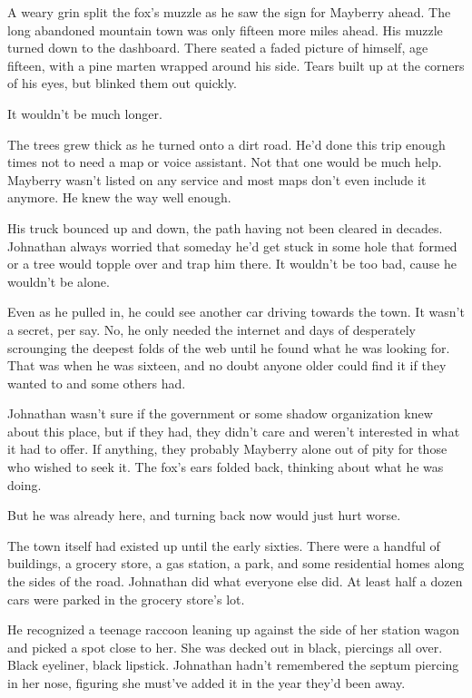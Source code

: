 A weary grin split the fox's muzzle as he saw the sign for Mayberry
ahead. The long abandoned mountain town was only fifteen more miles
ahead. His muzzle turned down to the dashboard. There seated a faded
picture of himself, age fifteen, with a pine marten wrapped around his
side. Tears built up at the corners of his eyes, but blinked them out
quickly.

It wouldn't be much longer.

The trees grew thick as he turned onto a dirt road. He'd done this trip
enough times not to need a map or voice assistant. Not that one would be
much help. Mayberry wasn't listed on any service and most maps don't
even include it anymore. He knew the way well enough.

His truck bounced up and down, the path having not been cleared in
decades. Johnathan always worried that someday he'd get stuck in some
hole that formed or a tree would topple over and trap him there. It
wouldn't be too bad, cause he wouldn't be alone.

Even as he pulled in, he could see another car driving towards the town.
It wasn't a secret, per say. No, he only needed the internet and days of
desperately scrounging the deepest folds of the web until he found what
he was looking for. That was when he was sixteen, and no doubt anyone
older could find it if they wanted to and some others had.

Johnathan wasn't sure if the government or some shadow organization knew
about this place, but if they had, they didn't care and weren't
interested in what it had to offer. If anything, they probably Mayberry
alone out of pity for those who wished to seek it. The fox's ears folded
back, thinking about what he was doing.

But he was already here, and turning back now would just hurt worse.

The town itself had existed up until the early sixties. There were a
handful of buildings, a grocery store, a gas station, a park, and some
residential homes along the sides of the road. Johnathan did what
everyone else did. At least half a dozen cars were parked in the grocery
store's lot.

He recognized a teenage raccoon leaning up against the side of her
station wagon and picked a spot close to her. She was decked out in
black, piercings all over. Black eyeliner, black lipstick. Johnathan
hadn't remembered the septum piercing in her nose, figuring she must've
added it in the year they'd been away.

